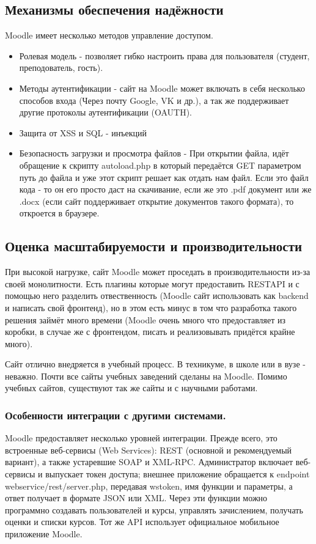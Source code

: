 \documentclass[a4paper, 14pt]{extarticle}
\begin{document}
\subsection{Механизмы обеспечения надёжности}
Moodle имеет несколько методов управление доступом.
\begin{itemize}
    \item Ролевая модель - позволяет гибко настроить права для пользователя (студент, преподователь, гость).
    \item Методы аутентификации - сайт на Moodle может включать в себя несколько способов входа (Через почту Google, VK и др.), а так же поддерживает другие протоколы аутентификации (OAUTH). 
    \item Защита от XSS и SQL - инъекций
    \item Безопасность загрузки и просмотра файлов - При открытии файла, идёт обращение к скрипту autoload.php в который передаётся GET параметром путь до файла и уже этот скрипт решает как отдать нам файл. Если это файл кода - то он его просто даст на скачивание, если же это .pdf документ или же .docx (если сайт поддерживает открытие документов такого формата), то откроется в браузере. 
\end{itemize}

\subsection{Оценка масштабируемости и производительности}
При высокой нагрузке, сайт Moodle может проседать в производительности из-за своей монолитности. Есть плагины которые могут предоставить RESTAPI и с помощью него разделить отвественность (Moodle сайт использовать как backend и написать свой фронтенд), но в этом есть минус в том что разработка такого решения займёт много времени (Moodle очень много что предоставляет из коробки, в случае же с фронтендом, писать и реализовывать придётся крайне много). \par
Сайт отлично внедряется в учебный процесс. В техникуме, в школе или в вузе - неважно. Почти все сайты учебных заведений сделаны на Moodle. Помимо учебных сайтов, существуют так же сайты и с научными работами.

\subsubsection{Особенности интеграции с другими системами.}
Moodle предоставляет несколько уровней интеграции. Прежде всего, это встроенные веб-сервисы (Web Services): REST (основной и рекомендуемый вариант), а также устаревшие SOAP и XML-RPC. Администратор включает веб-сервисы и выпускает токен доступа; внешнее приложение обращается к endpoint webservice/rest/server.php, передавая wstoken, имя функции и параметры, а ответ получает в формате JSON или XML. Через эти функции можно программно создавать пользователей и курсы, управлять зачислением, получать оценки и списки курсов. Тот же API использует официальное мобильное приложение Moodle.
\end{document}
